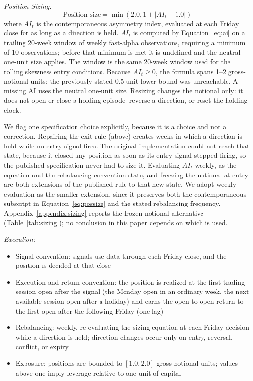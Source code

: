\documentclass[11pt]{article}
\begin{document}
\textit{Position Sizing:}
\begin{equation}
    \text{Position size} = \min(2.0, 1 + |AI_t - 1.0|)
    \label{eq:possize}
\end{equation}
where $AI_t$ is the contemporaneous asymmetry index, evaluated at each Friday close for as long as a direction is held. $AI_t$ is computed by Equation~\ref{eq:ai} on a trailing 20-week window of weekly fast-alpha observations, requiring a minimum of 10 observations; before that minimum is met it is undefined and the neutral one-unit size applies. The window is the same 20-week window used for the rolling skewness entry conditions. Because $AI_t \geq 0$, the formula spans 1--2 gross-notional units; the previously stated 0.5-unit lower bound was unreachable. A missing AI uses the neutral one-unit size. Resizing changes the notional only: it does not open or close a holding episode, reverse a direction, or reset the holding clock.

We flag one specification choice explicitly, because it is a choice and not a correction. Repairing the exit rule (above) creates weeks in which a direction is held while no entry signal fires. The original implementation could not reach that state, because it closed any position as soon as its entry signal stopped firing, so the published specification never had to size it. Evaluating $AI_t$ weekly, as the equation and the rebalancing convention state, and freezing the notional at entry are both extensions of the published rule to that new state. We adopt weekly evaluation as the smaller extension, since it preserves both the contemporaneous subscript in Equation~\ref{eq:possize} and the stated rebalancing frequency. Appendix~\ref{appendix:sizing} reports the frozen-notional alternative (Table~\ref{tab:sizing}); no conclusion in this paper depends on which is used.

\textit{Execution:}
\begin{itemize}
    \item Signal convention: signals use data through each Friday close, and the position is decided at that close
    \item Execution and return convention: the position is realized at the first trading-session open after the signal (the Monday open in an ordinary week, the next available session open after a holiday) and earns the open-to-open return to the first open after the following Friday (one lag)
    \item Rebalancing: weekly, re-evaluating the sizing equation at each Friday decision while a direction is held; direction changes occur only on entry, reversal, conflict, or expiry
    \item Exposure: positions are bounded to $[1.0, 2.0]$ gross-notional units; values above one imply leverage relative to one unit of capital
\end{itemize}
\end{document}
